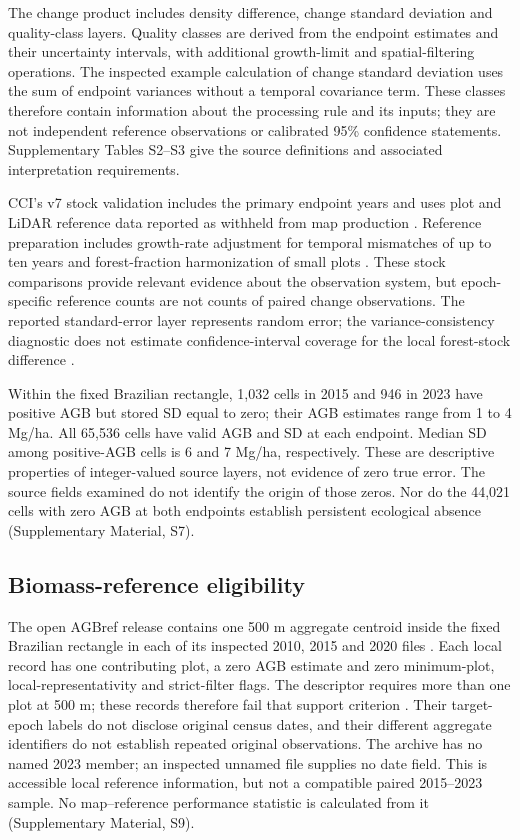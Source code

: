\documentclass[11pt,a4paper]{article}
\begin{document}
The change product includes density difference, change standard deviation and quality-class layers. Quality classes are derived from the endpoint estimates and their uncertainty intervals, with additional growth-limit and spatial-filtering operations. The inspected example calculation of change standard deviation uses the sum of endpoint variances without a temporal covariance term. These classes therefore contain information about the processing rule and its inputs; they are not independent reference observations or calibrated 95\% confidence statements. Supplementary Tables S2--S3 give the source definitions and associated interpretation requirements.

CCI's v7 stock validation includes the primary endpoint years and uses plot and LiDAR reference data reported as withheld from map production \citep[pp.~11--14, 64, 67]{PVIR2026}. Reference preparation includes growth-rate adjustment for temporal mismatches of up to ten years and forest-fraction harmonization of small plots \citep[p.~18]{PVIR2026}. These stock comparisons provide relevant evidence about the observation system, but epoch-specific reference counts are not counts of paired change observations. The reported standard-error layer represents random error; the variance-consistency diagnostic does not estimate confidence-interval coverage for the local forest-stock difference \citep[p.~19]{PVIR2026}.


Within the fixed Brazilian rectangle, 1,032 cells in 2015 and 946 in 2023 have positive AGB but stored SD equal to zero; their AGB estimates range from 1 to 4 Mg/ha. All 65,536 cells have valid AGB and SD at each endpoint. Median SD among positive-AGB cells is 6 and 7 Mg/ha, respectively. These are descriptive properties of integer-valued source layers, not evidence of zero true error. The source fields examined do not identify the origin of those zeros. Nor do the 44,021 cells with zero AGB at both endpoints establish persistent ecological absence (Supplementary Material, S7).

\subsection{Biomass-reference eligibility}

The open AGBref release contains one 500 m aggregate centroid inside the fixed Brazilian rectangle in each of its inspected 2010, 2015 and 2020 files \citep{AGBrefData2026}. Each local record has one contributing plot, a zero AGB estimate and zero minimum-plot, local-representativity and strict-filter flags. The descriptor requires more than one plot at 500 m; these records therefore fail that support criterion \citep{AGBref2026}. Their target-epoch labels do not disclose original census dates, and their different aggregate identifiers do not establish repeated original observations. The archive has no named 2023 member; an inspected unnamed file supplies no date field. This is accessible local reference information, but not a compatible paired 2015--2023 sample. No map--reference performance statistic is calculated from it (Supplementary Material, S9).
\end{document}

